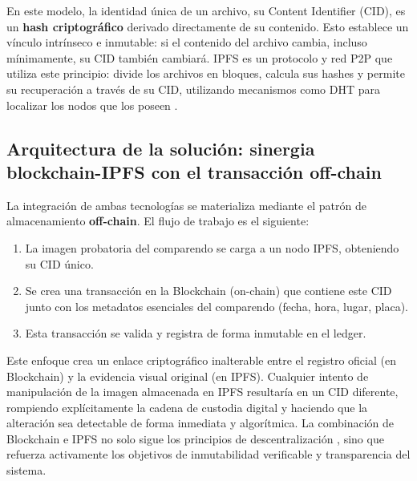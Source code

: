 En este modelo, la identidad única de un archivo, su Content Identifier (CID), es un \textbf{hash criptográfico} derivado directamente de su contenido. Esto establece un vínculo intrínseco e inmutable: si el contenido del archivo cambia, incluso mínimamente, su CID también cambiará. IPFS es un protocolo y red P2P que utiliza este principio: divide los archivos en bloques, calcula sus hashes y permite su recuperación a través de su CID, utilizando mecanismos como DHT para localizar los nodos que los poseen \parencite{maymounkov2002kademlia, benet2014ipfs}.

\subsection{Arquitectura de la solución: sinergia blockchain-IPFS con el transacción off-chain}
La integración de ambas tecnologías se materializa mediante el patrón de almacenamiento \textbf{off-chain}. El flujo de trabajo es el siguiente:
\begin{enumerate}
    \item La imagen probatoria del comparendo se carga a un nodo IPFS, obteniendo su CID único.
    \item Se crea una transacción en la Blockchain (on-chain) que contiene este CID junto con los metadatos esenciales del comparendo (fecha, hora, lugar, placa).
    \item Esta transacción se valida y registra de forma inmutable en el ledger.
\end{enumerate}
Este enfoque crea un enlace criptográfico inalterable entre el registro oficial (en Blockchain) y la evidencia visual original (en IPFS). Cualquier intento de manipulación de la imagen almacenada en IPFS resultaría en un CID diferente, rompiendo explícitamente la cadena de custodia digital y haciendo que la alteración sea detectable de forma inmediata y algorítmica. La combinación de Blockchain e IPFS no solo sigue los principios de descentralización \parencite{vanSteen2017}, sino que refuerza activamente los objetivos de inmutabilidad verificable y transparencia del sistema.

